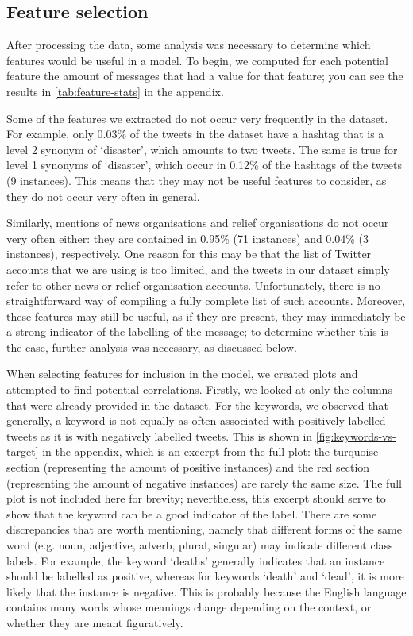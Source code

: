 \subsection{Feature selection}
After processing the data, some analysis was necessary to determine which features would be useful in a model.
To begin, we computed for each potential feature the amount of messages that had a value for that feature; you can see the results in
\autoref{tab:feature-stats} in the appendix.

Some of the features we extracted do not occur very frequently in the dataset.
For example, only 0.03\% of the tweets in the dataset have a hashtag that is a level 2 synonym of `disaster', which amounts to two tweets.
The same is true for level 1 synonyms of `disaster', which occur in 0.12\% of the hashtags of the tweets (9 instances).
This means that they may not be useful features to consider, as they do not occur very often in general.

Similarly, mentions of news organisations and relief organisations do not occur very often either: they are contained in 0.95\% (71 instances) and 0.04\% (3 instances), respectively.
One reason for this may be that the list of Twitter accounts that we are using is too limited, and the tweets in our dataset simply refer to other news or relief organisation accounts.
Unfortunately, there is no straightforward way of compiling a fully complete list of such accounts.
Moreover, these features may still be useful, as if they are present, they may immediately be a strong indicator of the labelling of the message; to determine whether this is the case, further analysis was necessary, as discussed below.

When selecting features for inclusion in the model, we created plots and attempted to find potential correlations.
Firstly, we looked at only the columns that were already provided in the dataset.
For the keywords, we observed that generally, a keyword is not equally as often associated with positively labelled tweets as it is with negatively labelled tweets.
This is shown in \autoref{fig:keywords-vs-target} in the appendix, which is an excerpt from the full plot: the turquoise section (representing the amount of positive instances) and the red section (representing the amount of negative instances) are rarely the same size.
The full plot is not included here for brevity; nevertheless, this excerpt should serve to show that the keyword can be a good indicator of the label.
There are some discrepancies that are worth mentioning, namely that different forms of the same word (e.g.
noun, adjective, adverb, plural, singular) may indicate different class labels.
For example, the keyword `deaths' generally indicates that an instance should be labelled as positive, whereas for keywords `death' and `dead', it is more likely that the instance is negative.
This is probably because the English language contains many words whose meanings change depending on the context, or whether they are meant figuratively.

